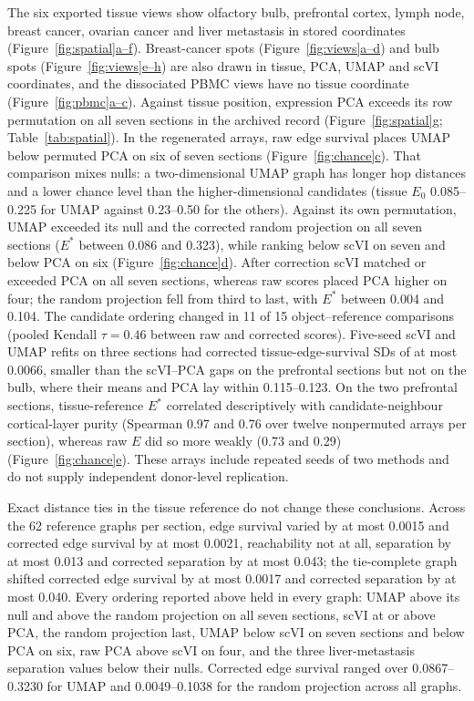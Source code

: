 \documentclass[11pt]{article}
\newcommand{\figpanel}[2]{Figure~\hyperref[#1]{\ref*{#1}#2}}
\begin{document}
The six exported tissue views show olfactory bulb, prefrontal cortex, lymph node, breast cancer, ovarian cancer and liver metastasis in stored coordinates (\figpanel{fig:spatial}{a--f}). Breast-cancer spots (\figpanel{fig:views}{a--d}) and bulb spots (\figpanel{fig:views}{e--h}) are also drawn in tissue, PCA, UMAP and scVI coordinates, and the dissociated PBMC views have no tissue coordinate (\figpanel{fig:pbmc}{a--c}). Against tissue position, expression PCA exceeds its row permutation on all seven sections in the archived record (\figpanel{fig:spatial}{g}; Table~\ref{tab:spatial}). In the regenerated arrays, raw edge survival places UMAP below permuted PCA on six of seven sections (\figpanel{fig:chance}{c}). That comparison mixes nulls: a two-dimensional UMAP graph has longer hop distances and a lower chance level than the higher-dimensional candidates (tissue $E_0$ 0.085--0.225 for UMAP against 0.23--0.50 for the others). Against its own permutation, UMAP exceeded its null and the corrected random projection on all seven sections ($E^*$ between 0.086 and 0.323), while ranking below scVI on seven and below PCA on six (\figpanel{fig:chance}{d}). After correction scVI matched or exceeded PCA on all seven sections, whereas raw scores placed PCA higher on four; the random projection fell from third to last, with $E^*$ between 0.004 and 0.104. The candidate ordering changed in 11 of 15 object--reference comparisons (pooled Kendall $\tau=0.46$ between raw and corrected scores). Five-seed scVI and UMAP refits on three sections had corrected tissue-edge-survival SDs of at most 0.0066, smaller than the scVI--PCA gaps on the prefrontal sections but not on the bulb, where their means and PCA lay within 0.115--0.123. On the two prefrontal sections, tissue-reference $E^*$ correlated descriptively with candidate-neighbour cortical-layer purity (Spearman 0.97 and 0.76 over twelve nonpermuted arrays per section), whereas raw $E$ did so more weakly (0.73 and 0.29) (\figpanel{fig:chance}{e}). These arrays include repeated seeds of two methods and do not supply independent donor-level replication.

Exact distance ties in the tissue reference do not change these conclusions. Across the 62 reference graphs per section, edge survival varied by at most 0.0015 and corrected edge survival by at most 0.0021, reachability not at all, separation by at most 0.013 and corrected separation by at most 0.043; the tie-complete graph shifted corrected edge survival by at most 0.0017 and corrected separation by at most 0.040. Every ordering reported above held in every graph: UMAP above its null and above the random projection on all seven sections, scVI at or above PCA, the random projection last, UMAP below scVI on seven sections and below PCA on six, raw PCA above scVI on four, and the three liver-metastasis separation values below their nulls. Corrected edge survival ranged over 0.0867--0.3230 for UMAP and 0.0049--0.1038 for the random projection across all graphs.
\end{document}
